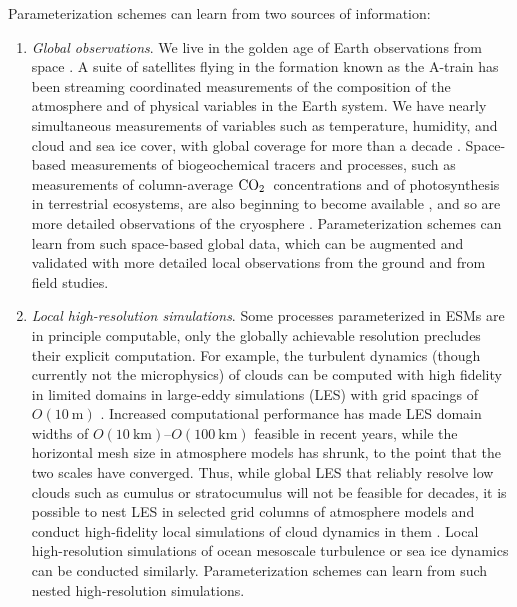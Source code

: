 \documentclass[draft]{agujournal}
\newcommand{\coo}{${\rm {CO}_{2}}$}
\begin{document}
Parameterization schemes can learn from two sources of information:
\begin{enumerate}
\item \emph{Global observations}. We live in the golden age of Earth observations from space \citep{LEcuyer15a}. A suite of satellites flying in the formation known as the A-train has been streaming coordinated measurements of the composition of the atmosphere and of physical variables in the Earth system. We have nearly simultaneous measurements of variables such as temperature, humidity, and cloud and sea ice cover, with global coverage for more than a decade \citep{Stephens02a,Jiang12a,Simmons16a,Stephens17a}. Space-based measurements of biogeochemical tracers and processes, such as measurements of column-average \coo\ concentrations and of photosynthesis in terrestrial ecosystems, are also beginning to become available \citep[e.g.,][]{Crisp04a,Yokota09a,Frankenberg11a,Joiner11a,Frankenberg14a,Bloom16a,Eldering17a,Liu17a,Sun17a}, and so are more detailed observations of the cryosphere \citep[e.g.,][]{Shepherd12a,Gardner13a,Vaughan13a}. Parameterization schemes can learn from such space-based global data, which can be augmented and validated with more detailed local observations from the ground and from field studies.
\item \emph{Local high-resolution simulations}. Some processes parameterized in ESMs are in principle computable, only the globally achievable resolution precludes their explicit computation. For example, the turbulent dynamics (though currently not the microphysics) of clouds can be computed with high fidelity in limited domains in large-eddy simulations (LES) with grid spacings of $O(10~\mathrm{m})$ \citep{Siebesma03,Stevens05a,Khairoutdinov09a,Matheou14a,Schalkwijk15a,Pressel15a,Pressel17a}. Increased computational performance has made LES domain widths of $O(10~\mathrm{km})$--$O(100~\mathrm{km})$ feasible in recent years, while the horizontal mesh size in atmosphere models has shrunk, to the point that the two scales have converged. Thus, while global LES that reliably resolve low clouds such as cumulus or stratocumulus will not be feasible for decades, it is possible to nest LES in selected grid columns of atmosphere models and conduct high-fidelity local simulations of cloud dynamics in them \citep{Schneider17a}. Local high-resolution simulations of ocean mesoscale turbulence or sea ice dynamics can be conducted similarly. Parameterization schemes can learn from such nested high-resolution simulations.
\end{enumerate}
\end{document}
